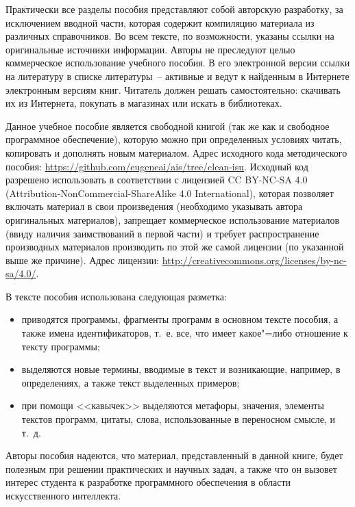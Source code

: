 \documentclass[a4paper,14pt, openany, twoside, final]{extbook} %
\begin{document}
Практически все разделы пособия представляют собой авторскую разработку, за исключением вводной части, которая содержит компиляцию материала из различных справочников.  Во всем тексте, по возможности, указаны ссылки на оригинальные источники информации.  Авторы не преследуют целью коммерческое использование учебного пособия.  В его электронной версии ссылки на литературу в списке литературы~-- активные и ведут к найденным в Интернете электронным версиям книг.  Читатель должен решать самостоятельно: скачивать их из Интернета, покупать в магазинах или искать в библиотеках.

Данное учебное пособие является свободной книгой (так же как и свободное программное обеспечение), которую можно при определенных условиях читать, копировать и дополнять новым материалом. Адрес исходного кода методического пособия: \url{https://github.com/eugeneai/ais/tree/clean-isu}. Исходный код разрешено использовать в соответствии с лицензией \foreignlanguage{english}{CC BY-NC-SA 4.0 (Attribution-NonCommercial-ShareAlike 4.0 International)}, которая позволяет включать материал в свои произведения (необходимо указывать автора оригинальных материалов), запрещает коммерческое использование материалов (ввиду наличия заимствований в первой части) и требует распространение производных материалов производить по этой же самой лицензии (по указанной выше же причине). Адрес лицензии: \url{http://creativecommons.org/licenses/by-nc-sa/4.0/}.

В тексте пособия использована следующая разметка:
\begin{itemize}[itemsep=0pt,parsep=0pt,topsep=0pt]
\item{} {} приводятся программы, фрагменты программ в основном тексте пособия, а также имена идентификаторов, т.~е. все, что имеет какое"=либо отношение к тексту программы;
\item{} {} выделяются новые термины, вводимые в текст и возникающие, например, в определениях, а также текст выделенных примеров;
\item{} {\normalfont при помощи <<кавычек>>} выделяются метафоры, значения, элементы текстов программ, цитаты, слова, использованные в переносном смысле, и т.~д.
\end{itemize}

Авторы пособия надеются, что материал, представленный в данной книге, будет полезным при решении практических и научных задач, а также что он вызовет интерес студента к разработке программного обеспечения в области искусственного интеллекта.
\end{document}
